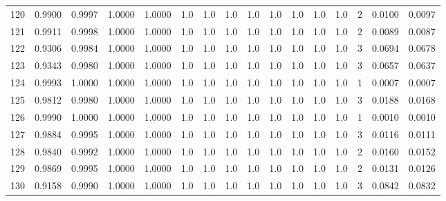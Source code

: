 \begin{tabular}{lrrrrrrrrrrrrrrr}
120 &      0.9900 &  0.9997 &  1.0000 &  1.0000 &     1.0 &     1.0 &     1.0 &     1.0 &     1.0 &     1.0 &      1.0 &        1.0 &      2 &                    0.0100 &                     0.0097 \\
121 &      0.9911 &  0.9998 &  1.0000 &  1.0000 &     1.0 &     1.0 &     1.0 &     1.0 &     1.0 &     1.0 &      1.0 &        1.0 &      2 &                    0.0089 &                     0.0087 \\
122 &      0.9306 &  0.9984 &  1.0000 &  1.0000 &     1.0 &     1.0 &     1.0 &     1.0 &     1.0 &     1.0 &      1.0 &        1.0 &      3 &                    0.0694 &                     0.0678 \\
123 &      0.9343 &  0.9980 &  1.0000 &  1.0000 &     1.0 &     1.0 &     1.0 &     1.0 &     1.0 &     1.0 &      1.0 &        1.0 &      3 &                    0.0657 &                     0.0637 \\
124 &      0.9993 &  1.0000 &  1.0000 &  1.0000 &     1.0 &     1.0 &     1.0 &     1.0 &     1.0 &     1.0 &      1.0 &        1.0 &      1 &                    0.0007 &                     0.0007 \\
125 &      0.9812 &  0.9980 &  1.0000 &  1.0000 &     1.0 &     1.0 &     1.0 &     1.0 &     1.0 &     1.0 &      1.0 &        1.0 &      3 &                    0.0188 &                     0.0168 \\
126 &      0.9990 &  1.0000 &  1.0000 &  1.0000 &     1.0 &     1.0 &     1.0 &     1.0 &     1.0 &     1.0 &      1.0 &        1.0 &      1 &                    0.0010 &                     0.0010 \\
127 &      0.9884 &  0.9995 &  1.0000 &  1.0000 &     1.0 &     1.0 &     1.0 &     1.0 &     1.0 &     1.0 &      1.0 &        1.0 &      3 &                    0.0116 &                     0.0111 \\
128 &      0.9840 &  0.9992 &  1.0000 &  1.0000 &     1.0 &     1.0 &     1.0 &     1.0 &     1.0 &     1.0 &      1.0 &        1.0 &      2 &                    0.0160 &                     0.0152 \\
129 &      0.9869 &  0.9995 &  1.0000 &  1.0000 &     1.0 &     1.0 &     1.0 &     1.0 &     1.0 &     1.0 &      1.0 &        1.0 &      2 &                    0.0131 &                     0.0126 \\
130 &      0.9158 &  0.9990 &  1.0000 &  1.0000 &     1.0 &     1.0 &     1.0 &     1.0 &     1.0 &     1.0 &      1.0 &        1.0 &      3 &                    0.0842 &                     0.0832 \\

\end{tabular}
